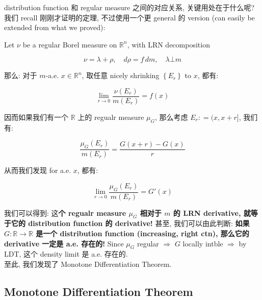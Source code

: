 distribution function 和 regular measure 之间的对应关系, 关键用处在于什么呢? 我们 recall 刚刚才证明的定理, 不过使用一个更 general 的 version (can easily be extended from what we proved):

\begin{theorem}{}

Let \(\nu\) be a regular Borel measure on \(\mathbb{R}^{n}\), with LRN decomposition

\[\nu = \lambda + \rho,\quad d\rho = f\, dm,\quad\lambda\bot m\]

那么: 对于 \(m\)-a.e. \(x \in \mathbb{R}^{n}\), 取任意 nicely shrinking \(\left\{ E_{r} \right\}\) to \(x\), 都有:

\[\lim\limits_{r\rightarrow 0}\frac{\nu(E_{r})}{m(E_{r})} = f(x)\]

\end{theorem}

因而如果我们有一个 \(\mathbb{R}\) 上的 regualr measure \(\mu_{G}\), 那么考虑 \(E_{r}: = (x,x + r\rbrack\), 我们有:

\[\frac{\mu_{G}(E_{r})}{m(E_{r})} = \frac{G(x + r) - G(x)}{r}\]

从而我们发现 for a.e. \(x\), 都有:

\[\lim\limits_{r\rightarrow 0}\frac{\mu_{G}(E_{r})}{m(E_{r})} = G'(x)\]

我们可以得到: 这\textbf{个 regualr measure \(\mu_{G}\) 相对于 \(m\) 的 LRN derivative, 就等于它的 distribution function 的 derivative!} 甚至, 我们可以由此判断: \textbf{如果 \(G:\mathbb{R}\rightarrow\mathbb{R}\) 是一个 distribution function (increasing, right ctn), 那么它的 derivative 一定是 a.e. 存在的!} Since \(\mu_{G}\) regular \(\Longrightarrow\) \(G\) locally intble \(\Longrightarrow\) by LDT, 这个 density limit 是 a.e. 存在的.\\
至此, 我们发现了 Monotone Differentiation Theorem.\\

\subsection{Monotone Differentiation Theorem}\label{monotone-differentiation-theorem}

